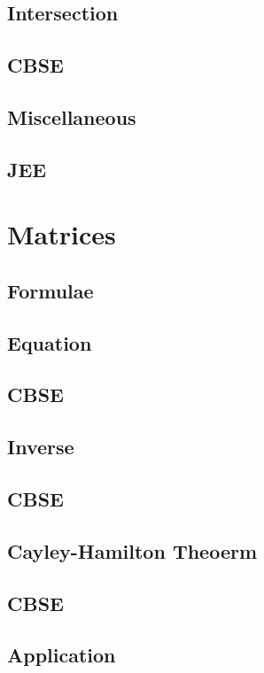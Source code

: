 \documentclass[journal]{IEEEtran}
\begin{document}
\subsection{Intersection}

\subsection{CBSE}

\subsection{Miscellaneous }

\subsection{JEE}

\newpage
\section{Matrices}
\subsection{Formulae}

\subsection{Equation}

\subsection{CBSE}

\subsection{Inverse}

\subsection{CBSE}

\subsection{Cayley-Hamilton Theoerm}

\subsection{CBSE}

\subsection{Application}

\end{document}
